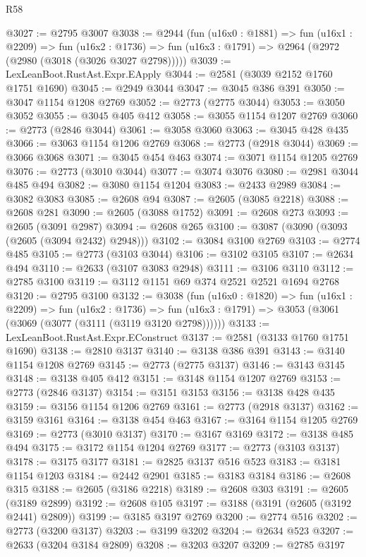 \begin{lexlean}{R58}
\begin{coremodule}
@3027 := @2795 @3007
@3038 := @2944
    (fun (u16x0 : @1881) =>
    fun (u16x1 : @2209) =>
    fun (u16x2 : @1736) => fun (u16x3 : @1791) => @2964 (@2972 (@2980 (@3018 (@3026 @3027 @2798)))))
@3039 := LexLeanBoot.RustAst.Expr.EApply
@3044 := @2581 (@3039 @2152 @1760 @1751 @1690)
@3045 := @2949 @3044
@3047 := @3045 @386 @391
@3050 := @3047 @1154 @1208 @2769
@3052 := @2773 (@2775 @3044)
@3053 := @3050 @3052
@3055 := @3045 @405 @412
@3058 := @3055 @1154 @1207 @2769
@3060 := @2773 (@2846 @3044)
@3061 := @3058 @3060
@3063 := @3045 @428 @435
@3066 := @3063 @1154 @1206 @2769
@3068 := @2773 (@2918 @3044)
@3069 := @3066 @3068
@3071 := @3045 @454 @463
@3074 := @3071 @1154 @1205 @2769
@3076 := @2773 (@3010 @3044)
@3077 := @3074 @3076
@3080 := @2981 @3044 @485 @494
@3082 := @3080 @1154 @1204
@3083 := @2433 @2989
@3084 := @3082 @3083
@3085 := @2608 @94
@3087 := @2605 (@3085 @2218)
@3088 := @2608 @281
@3090 := @2605 (@3088 @1752)
@3091 := @2608 @273
@3093 := @2605 (@3091 @2987)
@3094 := @2608 @265
@3100 := @3087 (@3090 (@3093 (@2605 (@3094 @2432) @2948)))
@3102 := @3084 @3100 @2769
@3103 := @2774 @485
@3105 := @2773 (@3103 @3044)
@3106 := @3102 @3105
@3107 := @2634 @494
@3110 := @2633 (@3107 @3083 @2948)
@3111 := @3106 @3110
@3112 := @2785 @3100
@3119 := @3112 @1151 @69 @374 @2521 @2521 @1694 @2768
@3120 := @2795 @3100
@3132 := @3038
    (fun (u16x0 : @1820) =>
    fun (u16x1 : @2209) =>
    fun (u16x2 : @1736) =>
    fun (u16x3 : @1791) => @3053 (@3061 (@3069 (@3077 (@3111 (@3119 @3120 @2798))))))
@3133 := LexLeanBoot.RustAst.Expr.EConstruct
@3137 := @2581 (@3133 @1760 @1751 @1690)
@3138 := @2810 @3137
@3140 := @3138 @386 @391
@3143 := @3140 @1154 @1208 @2769
@3145 := @2773 (@2775 @3137)
@3146 := @3143 @3145
@3148 := @3138 @405 @412
@3151 := @3148 @1154 @1207 @2769
@3153 := @2773 (@2846 @3137)
@3154 := @3151 @3153
@3156 := @3138 @428 @435
@3159 := @3156 @1154 @1206 @2769
@3161 := @2773 (@2918 @3137)
@3162 := @3159 @3161
@3164 := @3138 @454 @463
@3167 := @3164 @1154 @1205 @2769
@3169 := @2773 (@3010 @3137)
@3170 := @3167 @3169
@3172 := @3138 @485 @494
@3175 := @3172 @1154 @1204 @2769
@3177 := @2773 (@3103 @3137)
@3178 := @3175 @3177
@3181 := @2825 @3137 @516 @523
@3183 := @3181 @1154 @1203
@3184 := @2442 @2901
@3185 := @3183 @3184
@3186 := @2608 @315
@3188 := @2605 (@3186 @2218)
@3189 := @2608 @303
@3191 := @2605 (@3189 @2899)
@3192 := @2608 @105
@3197 := @3188 (@3191 (@2605 (@3192 @2441) @2809))
@3199 := @3185 @3197 @2769
@3200 := @2774 @516
@3202 := @2773 (@3200 @3137)
@3203 := @3199 @3202
@3204 := @2634 @523
@3207 := @2633 (@3204 @3184 @2809)
@3208 := @3203 @3207
@3209 := @2785 @3197

\end{coremodule}
\end{lexlean}
